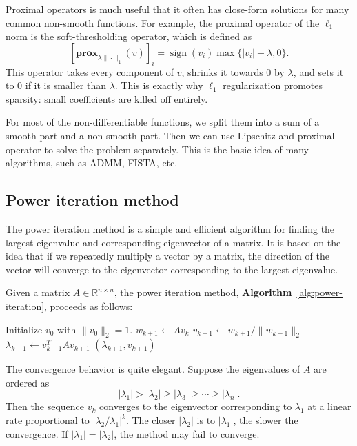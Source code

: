 \documentclass[lang=en,color=blue,mode=fancy,titlestyle=hang]{elegantbook}
\newcommand{\algoref}[1]{\textbf{Algorithm}~\ref{#1}}
\begin{document}
Proximal operators is much useful that it often has close-form solutions for many common non-smooth
functions. For example, the proximal operator of the $\ell_1$ norm is the soft-thresholding operator,
which is defined as
\[
[\mathbf{prox}_{\lambda \|\cdot\|_1}(v)]_i = \operatorname{sign}(v_i) \max\{|v_i| - \lambda, 0\}.
\]
This operator takes every component of $v$, shrinks it towards 0 by $\lambda$, and sets it to 0 if it
is smaller than $\lambda$. This is exactly why $\ell_1$ regularization promotes sparsity: small
coefficients are killed off entirely.

For most of the non-differentiable functions, we split them into a sum of a smooth part and a
non-smooth part. Then we can use Lipschitz and proximal operator to solve the problem separately.
This is the basic idea of many algorithms, such as  ADMM, FISTA, etc.

\subsection{Power iteration method}
The power iteration method is a simple and efficient algorithm for finding the largest eigenvalue
and corresponding eigenvector of a matrix. It is based on the idea that if we repeatedly multiply
a vector by a matrix, the direction of the vector will converge to the eigenvector corresponding
to the largest eigenvalue.

Given a matrix $A \in \mathbb{R}^{n \times n}$, the power iteration method, \algoref{alg:power-iteration}, proceeds as follows:
\begin{algorithm}[H]
\caption{Power Iteration method}
\label{alg:power-iteration}
\begin{algorithmic}
\State Initialize $v_0$ with $\|v_0\|_2 = 1$.
  \State $w_{k+1} \gets A v_k$
  \State $v_{k+1} \gets w_{k+1} / \|w_{k+1}\|_2$
  \State $\lambda_{k+1} \gets v_{k+1}^T A v_{k+1}$
\EndWhile
\State \Return $(\lambda_{k+1}, v_{k+1})$
\end{algorithmic}
\end{algorithm}

The convergence behavior is quite elegant. Suppose the eigenvalues of $A$ are ordered as
\[
|\lambda_1| > |\lambda_2| \ge |\lambda_3| \ge \cdots \ge |\lambda_n|.
\]
Then the sequence $v_k$ converges to the eigenvector corresponding to $\lambda_1$ at a linear rate
proportional to $|\lambda_2 / \lambda_1|^k$. The closer $|\lambda_2|$ is to $|\lambda_1|$, the slower
the convergence. If $|\lambda_1| = |\lambda_2|$, the method may fail to converge.
\end{document}

